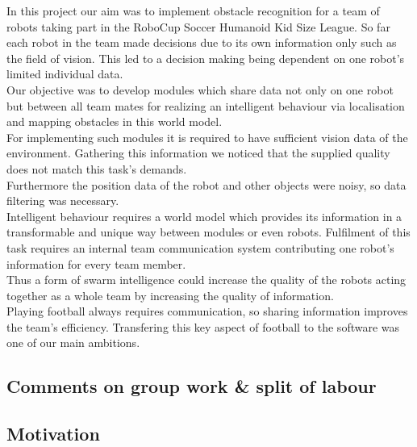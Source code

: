 \documentclass[lnicst,a4paper]{svmultln}
\begin{document}
In this project our aim was to implement obstacle recognition for a team of robots taking part in the RoboCup Soccer Humanoid Kid Size League. So far each robot in the team made decisions due to its own information only such as the field of vision. This led to a decision making being dependent on one robot's limited individual data.
\\
Our objective was to develop modules which share data not only on one robot but between all team mates for realizing an intelligent behaviour via localisation and mapping obstacles in this world model.
\\
For implementing such modules it is required to have sufficient vision data of the environment. Gathering this information we noticed that the supplied quality does not match this task's demands.
\\
Furthermore the position data of the robot and other objects were noisy, so data filtering was necessary.
\\
Intelligent behaviour requires a world model which provides its information in a transformable and unique way between modules or even robots. Fulfilment of this task requires an internal team communication system contributing one robot's information for every team member.
\\
Thus a form of swarm intelligence could increase the quality of the robots acting together as a whole team by increasing the quality of information.
\\
Playing football always requires communication, so sharing information improves the team's efficiency. Transfering this key aspect of football to the software was one of our main ambitions.





\subsection{Comments on group work \& split of labour}








\subsection{Motivation}
\end{document}
